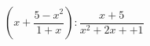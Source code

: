 \begin{ex}[type=expression]
	\begin{condition}
		\( \left( x+\dfrac{5-x^2}{1+x} \right):\dfrac{x+5}{x^2+2x++1} \)
	\end{condition}
\end{ex}